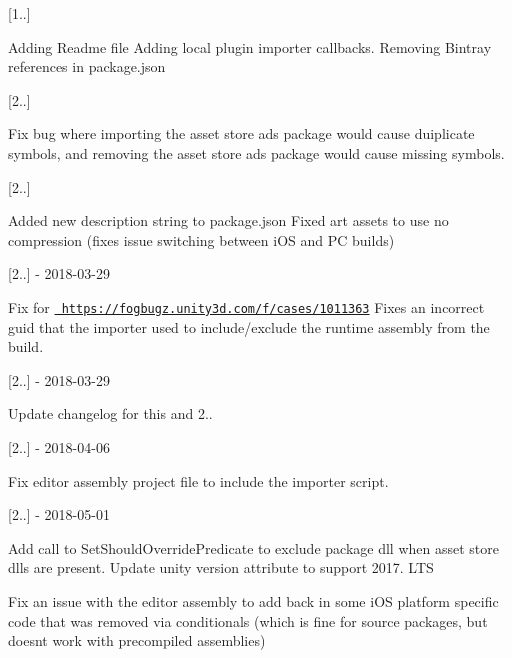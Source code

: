 \mbox{[}1..\mbox{]}

Adding Readme file Adding local plugin importer callbacks. Removing Bintray references in package.\+json

\mbox{[}2..\mbox{]}

Fix bug where importing the asset store ads package would cause duiplicate symbols, and removing the asset store ads package would cause missing symbols.

\mbox{[}2..\mbox{]}

Added new description string to package.\+json Fixed art assets to use no compression (fixes issue switching between i\+OS and PC builds)

\mbox{[}2..\mbox{]} -\/ 2018-\/03-\/29

Fix for \href{https://fogbugz.unity3d.com/f/cases/1011363}{\texttt{ https\+://fogbugz.\+unity3d.\+com/f/cases/1011363}} Fixes an incorrect guid that the importer used to include/exclude the runtime assembly from the build.

\mbox{[}2..\mbox{]} -\/ 2018-\/03-\/29

Update changelog for this and 2..

\mbox{[}2..\mbox{]} -\/ 2018-\/04-\/06

Fix editor assembly project file to include the importer script.

\mbox{[}2..\mbox{]} -\/ 2018-\/05-\/01

Add call to Set\+Should\+Override\+Predicate to exclude package dll when asset store dlls are present. Update unity version attribute to support 2017. LTS

Fix an issue with the editor assembly to add back in some i\+OS platform specific code that was removed via conditionals (which is fine for source packages, but doesn\textquotesingle{}t work with precompiled assemblies) 